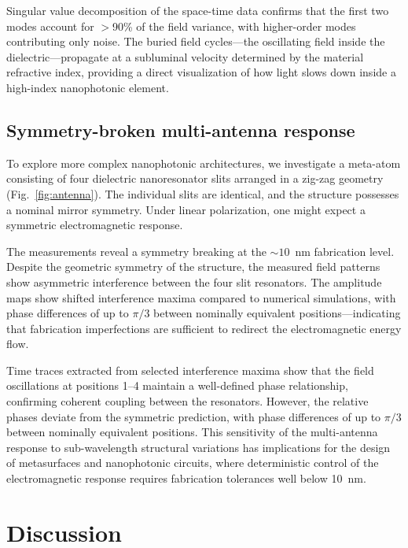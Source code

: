 \documentclass[12pt]{article}
\begin{document}
Singular value decomposition of the space-time data confirms that the first two modes account for $>$90\% of the field variance, with higher-order modes contributing only noise. The buried field cycles---the oscillating field inside the dielectric---propagate at a subluminal velocity determined by the material refractive index, providing a direct visualization of how light slows down inside a high-index nanophotonic element.

\subsection{Symmetry-broken multi-antenna response}

To explore more complex nanophotonic architectures, we investigate a meta-atom consisting of four dielectric nanoresonator slits arranged in a zig-zag geometry (Fig.~\ref{fig:antenna}). The individual slits are identical, and the structure possesses a nominal mirror symmetry. Under linear polarization, one might expect a symmetric electromagnetic response.

The measurements reveal a symmetry breaking at the ${\sim}10$~nm fabrication level. Despite the geometric symmetry of the structure, the measured field patterns show asymmetric interference between the four slit resonators. The amplitude maps show shifted interference maxima compared to numerical simulations, with phase differences of up to $\pi/3$ between nominally equivalent positions---indicating that fabrication imperfections are sufficient to redirect the electromagnetic energy flow.

Time traces extracted from selected interference maxima show that the field oscillations at positions 1--4 maintain a well-defined phase relationship, confirming coherent coupling between the resonators. However, the relative phases deviate from the symmetric prediction, with phase differences of up to $\pi/3$ between nominally equivalent positions. This sensitivity of the multi-antenna response to sub-wavelength structural variations has implications for the design of metasurfaces and nanophotonic circuits, where deterministic control of the electromagnetic response requires fabrication tolerances well below 10~nm.

\section{Discussion}
\label{sec:discussion}
\end{document}
